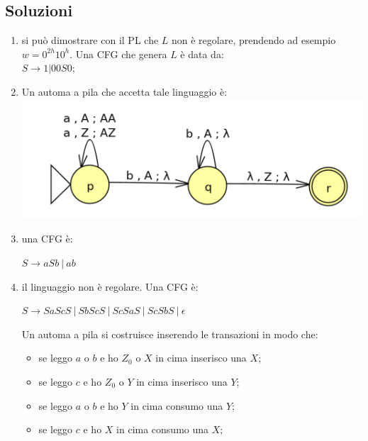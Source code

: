 \documentclass[a4paper,11pt]{article}
\begin{document}
\subsection{Soluzioni}
\begin{enumerate}
    \item si può dimostrare con il PL che $L$ non è regolare, prendendo ad esempio $w=0^{2h}10^h$. Una CFG che genera $L$ è data da:\\ $S\rightarrow 1|00S0$;
    \item Un automa a pila che accetta tale linguaggio è:\\\includegraphics[scale=0.4]{Lez7sol2.png}
    \item una CFG è:\\
    \begin{minipage}{\linewidth}
       \centering $S \rightarrow aSb\ |\ ab$
   \end{minipage}
   \item il linguaggio non è regolare. Una CFG è:\\
   \begin{minipage}{\linewidth}
      \centering $S \rightarrow SaScS\ |\ SbScS\ |\ ScSaS\ |\ ScSbS \ | \ \epsilon$
   \end{minipage}
   Un automa a pila si costruisce inserendo le transazioni in modo che:
   \begin{itemize}
    \item se leggo $a$ o $b$ e ho $Z_0$ o $X$ in cima inserisco una $X$;
    \item se leggo $c$ e ho $Z_0$ o $Y$ in cima inserisco una $Y$;
    \item se leggo $a$ o $b$ e ho $Y$ in cima consumo una $Y$;
    \item se leggo $c$ e ho $X$ in cima consumo una $X$;
   \end{itemize}

\end{enumerate}
\end{document}
